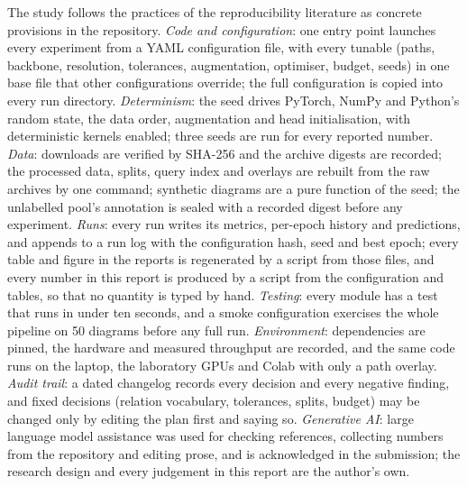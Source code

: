 The study follows the practices of the reproducibility literature \cite{pineau2021reproducibility} as concrete provisions in the repository. \emph{Code and configuration}: one entry point launches every experiment from a YAML configuration file, with every tunable (paths, backbone, resolution, tolerances, augmentation, optimiser, budget, seeds) in one base file that other configurations override; the full configuration is copied into every run directory. \emph{Determinism}: the seed drives PyTorch, NumPy and Python's random state, the data order, augmentation and head initialisation, with deterministic kernels enabled; three seeds are run for every reported number. \emph{Data}: downloads are verified by SHA-256 and the archive digests are recorded; the processed data, splits, query index and overlays are rebuilt from the raw archives by one command; synthetic diagrams are a pure function of the seed; the unlabelled pool's annotation is sealed with a recorded digest before any experiment. \emph{Runs}: every run writes its metrics, per-epoch history and predictions, and appends to a run log with the configuration hash, seed and best epoch; every table and figure in the reports is regenerated by a script from those files, and every number in this report is produced by a script from the configuration and tables, so that no quantity is typed by hand. \emph{Testing}: every module has a test that runs in under ten seconds, and a smoke configuration exercises the whole pipeline on 50 diagrams before any full run. \emph{Environment}: dependencies are pinned, the hardware and measured throughput are recorded, and the same code runs on the laptop, the laboratory GPUs and Colab with only a path overlay. \emph{Audit trail}: a dated changelog records every decision and every negative finding, and fixed decisions (relation vocabulary, tolerances, splits, budget) may be changed only by editing the plan first and saying so. \emph{Generative AI}: large language model assistance was used for checking references, collecting numbers from the repository and editing prose, and is acknowledged in the submission; the research design and every judgement in this report are the author's own.

